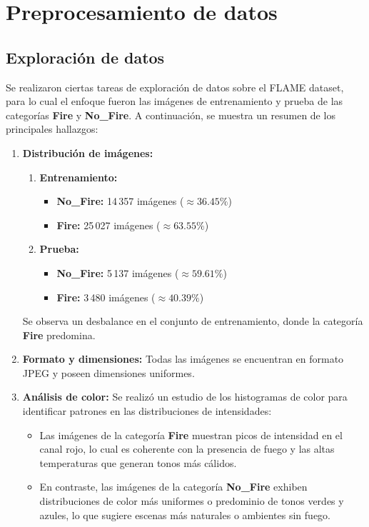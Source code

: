\section{Preprocesamiento de datos}

\subsection{Exploración de datos}
Se realizaron ciertas tareas de exploración de datos 
sobre el FLAME dataset, para lo cual el enfoque fueron las imágenes de entrenamiento
y prueba de las categorías \textbf{Fire} y \textbf{No\_Fire}. A continuación, se muestra 
un resumen de los principales hallazgos:
\begin{enumerate}
    \item \textbf{Distribución de imágenes:}
      \begin{enumerate}
          \item \textbf{Entrenamiento:}
          \begin{itemize}
              \item \textbf{No\_Fire:} 14\,357 imágenes (\(\approx 36.45\%\))
              \item \textbf{Fire:} 25\,027 imágenes (\(\approx 63.55\%\))
          \end{itemize}
          \item \textbf{Prueba:}
          \begin{itemize}
              \item \textbf{No\_Fire:} 5\,137 imágenes (\(\approx 59.61\%\))
              \item \textbf{Fire:} 3\,480 imágenes (\(\approx 40.39\%\))
          \end{itemize}
      \end{enumerate}
      Se observa un desbalance en el conjunto de entrenamiento, donde la categoría \textbf{Fire} 
      predomina.
      
    \item \textbf{Formato y dimensiones:}  
      Todas las imágenes se encuentran en formato JPEG y poseen dimensiones uniformes. 
    
    \item \textbf{Análisis de color:}  
      Se realizó un estudio de los histogramas de color para identificar patrones en las distribuciones de intensidades:
      \begin{itemize}
          \item Las imágenes de la categoría \textbf{Fire} muestran picos de intensidad en el canal rojo, 
          lo cual es coherente con la presencia de fuego y las altas temperaturas que generan tonos más cálidos.
          \item En contraste, las imágenes de la categoría \textbf{No\_Fire} exhiben distribuciones 
          de color más uniformes o predominio de tonos verdes y azules, lo que sugiere escenas más naturales 
          o ambientes sin fuego.
      \end{itemize}
\end{enumerate}

